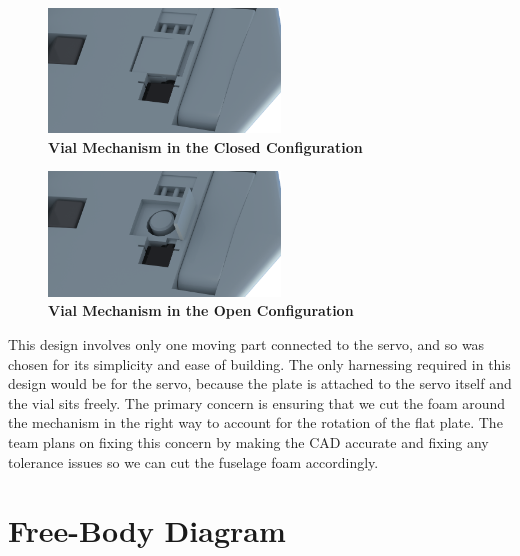         \begin{figure}[H]
            \centering
            \includegraphics[width=0.55\textwidth]{homeworks/homework4/report/Figure/aircraft_assembly_door_closed.png}
            \caption{\textbf{Vial Mechanism in the Closed Configuration}}
            \label{fig:vial_closed}
        \end{figure}
        
        \begin{figure}[H]
            \centering
            \includegraphics[width=0.55\textwidth]{homeworks/homework4/report/Figure/aircraft_assembly_door_open.png}
            \caption{\textbf{Vial Mechanism in the Open Configuration}}
            \label{fig:vial_open}
        \end{figure}
        
        This design involves only one moving part connected to the servo, and so was chosen for its simplicity and ease of building. The only harnessing required in this design would be for the servo, because the plate is attached to the servo itself and the vial sits freely. The primary concern is ensuring that we cut the foam around the mechanism in the right way to account for the rotation of the flat plate. The team plans on fixing this concern by making the CAD accurate and fixing any tolerance issues so we can cut the fuselage foam accordingly.
    
\section{Free-Body Diagram}

